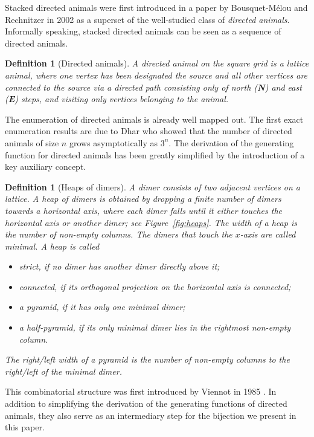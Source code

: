 \documentclass{article}
\newtheorem{definition}[theorem]{Definition}
\theoremstyle{definition}
\begin{document}
Stacked directed animals were first introduced in a paper by Bousquet-Mélou and Rechnitzer in 2002 \cite{LatticeAnimals} as a superset of the well-studied class of \textit{directed animals}.
Informally speaking, stacked directed animals can be seen as a sequence of directed animals.

\begin{definition}[Directed animals]
\label{def:directed_animal}
  A \emph{directed animal} on the square grid is a lattice animal, where one vertex has been designated the \emph{source} and all other vertices are connected to the source via a directed path consisting only of north (\textbf{N}) and east (\textbf{E}) steps, and visiting only vertices belonging to the animal.
\end{definition}

The enumeration of directed animals is already well mapped out. 
The first exact enumeration results are due to Dhar \cite{Dhar82, Dhar83} who showed that the number of directed animals of size $n$ grows asymptotically as $3^n$.
The derivation of the generating function for directed animals has been greatly simplified by the introduction of a key auxiliary concept.

\begin{definition}[Heaps of dimers]
  A \emph{dimer} consists of two adjacent vertices on a lattice. 
  A \emph{heap of dimers} is obtained by dropping a finite number of dimers towards a horizontal axis, where each dimer falls until it either touches the horizontal axis or another dimer; see Figure~\ref{fig:heaps}. 
  The \emph{width} of a heap is the number of non-empty columns. 
  The dimers that touch the $x$-axis are called \emph{minimal}.
  A heap is called
  \begin{itemize}
    \item \emph{strict}, if no dimer has another dimer directly above it;
    \item \emph{connected}, if its orthogonal projection on the horizontal axis is connected;
    \item a \emph{pyramid}, if it has only one minimal dimer;
    \item a \emph{half-pyramid}, if its only minimal dimer lies in the rightmost non-empty column.
  \end{itemize}
  The \emph{right/left width} of a pyramid is the number of non-empty columns to the right/left of the minimal dimer.
\end{definition}

This combinatorial structure was first introduced by Viennot in 1985 \cite{Heaps}.
In addition to simplifying the derivation of the generating functions of directed animals, they also serve as an intermediary step for the bijection we present in this paper.
\end{document}
